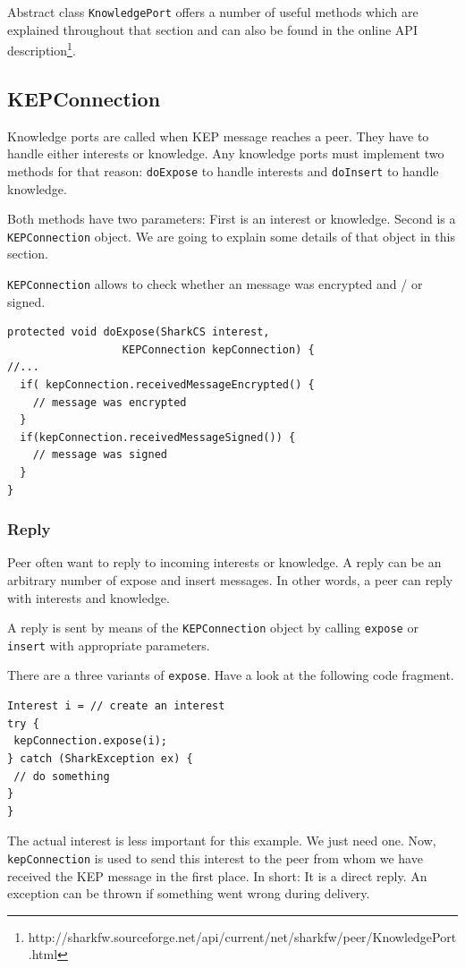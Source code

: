 Abstract class {\tt KnowledgePort} offers a number of useful methods which are explained throughout that section and can also be found in the online API description\footnote{http://sharkfw.sourceforge.net/api/current/net/sharkfw/peer/KnowledgePort.html}.

\subsection{KEPConnection}
Knowledge ports are called when KEP message reaches a peer. They have to handle either interests or knowledge. Any knowledge ports must implement two methods for that reason: {\tt doExpose} to handle interests and {\tt doInsert} to handle knowledge. 

Both methods have two parameters: First is an interest or knowledge. Second is a {\tt KEPConnection} object. We are going to explain some details of that object in this section.

{\tt KEPConnection} allows to check whether an message was encrypted and / or signed.

\begin{verbatim}
protected void doExpose(SharkCS interest, 
                  KEPConnection kepConnection) {
//...
  if( kepConnection.receivedMessageEncrypted() {
    // message was encrypted
  }
  if(kepConnection.receivedMessageSigned()) {
    // message was signed
  }
}
\end{verbatim}

\subsubsection{Reply}
Peer often want to reply to incoming interests or knowledge. A reply can be an arbitrary number of expose and insert messages. In other words, a peer can reply with interests and knowledge. 

A reply is sent by means of the {\tt KEPConnection} object by calling {\tt expose} or {\tt insert} with appropriate parameters.

There are a three variants of {\tt expose}. Have a look at the following code fragment.

\begin{verbatim}
Interest i = // create an interest
try {
 kepConnection.expose(i);
} catch (SharkException ex) {
 // do something 
}
}
\end{verbatim}

The actual interest is less important for this example. We just need one. Now, {\tt kepConnection} is used to send this interest to the peer from whom we have received the KEP message in the first place. In short: It is a direct reply. An exception can be thrown if something went wrong during delivery.

